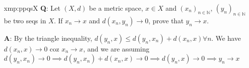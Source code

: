 \documentclass[landscape, 8pt]{extarticle}
\begin{document}
\begin{multicols}{3}
\begin{xmp}{xmp:ppqs}{X}
    \longrule{0.08ex}
    \textbf{Q}: Let $(X, d)$ be a metric space, $x\in X$ and $(x_{n})_{n\in \mathbb{N}}$, $(y_{n})_{n\in\mathbb{N}}$ be two seqs in $X$. If $x_{n}\to x$ and $d(x_{n}, y_{n})\to 0$, prove that $y_{n}\to x$.

    \textbf{A}: By the triangle inequality, $d(y_{n}, x) \le d(y_{n}, x_{n}) + d(x_{n}, x) \forall n$. We have $d(x_{n}, x) \to 0$ coz $x_{n} \to x$, and we are assuming $d(y_{n}, x_{n})\to 0 \implies d(y_{n}, x_{n}) + d(x_{n}, x)\to 0 \implies d(y_{n}, x)\to 0 \implies y_{n} \to x$

\end{xmp}



\vspace{1000em}
\end{multicols}
\end{document}
